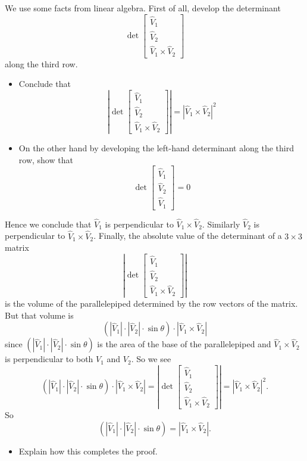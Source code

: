 \documentclass{ximera}
\begin{document}
\begin{problem}
We use some facts from linear algebra. First of all, develop the determinant%
\[
\det
\begin{bmatrix}
\hat{V}_{1} \\
\hat{V}_{2} \\
\hat{V}_{1}\times\hat{V}_{2}
\end{bmatrix}
\]
along the third row.
\begin{itemize}
\item Conclude that 
\[
\left\vert
\det
\begin{bmatrix}
\hat{V}_{1} \\
\hat{V}_{2} \\
\hat{V}_{1}\times\hat{V}_{2}
\end{bmatrix}\right\vert
=\left\vert \hat{V}_{1}\times\hat{V}_{2}\right\vert ^{2}
\]
\item On the other hand by developing the left-hand determinant along
  the third row, show that
\[
\det
\begin{bmatrix}
\hat{V}_{1} \\
\hat{V}_{2} \\
\hat{V}_{1}
\end{bmatrix}
=0
\]
\end{itemize}
Hence we conclude that $\hat{V}_{1}$ is perpendicular to
$\hat{V}_{1}\times\hat{V}_{2}$. Similarly $\hat{V}_{2}$ is
perpendicular to $\hat{V}_{1}\times\hat{V}_{2}$. Finally, the absolute
value of the determinant of a $3\times3$ matrix%
\[
\left\vert
\det
\begin{bmatrix}
\hat{V}_{1} \\
\hat{V}_{2} \\
\hat{V}_{1}\times\hat{V}_{2}
\end{bmatrix}
\right\vert
\]
is the volume of the parallelepiped determined by the row vectors of the
matrix. But that volume is%
\[
\left( \left\vert \hat{V}_{1}\right\vert \cdot\left\vert \hat{V}%
_{2}\right\vert \cdot\sin\theta\right)  \cdot\left\vert \hat{V}%
_{1}\times\hat{V}_{2}\right\vert
\]
since $\left(  \left\vert \hat{V}_{1}\right\vert \cdot\left\vert \hat{V}%
_{2}\right\vert \cdot\sin\theta\right)  $ is the area of the base
of the parallelepiped and $\hat{V}_{1}\times\hat{V}_{2}$ is perpendicular to
both $V_{1}$ and $V_{2}$. So we see
\[
\left(  \left\vert \hat{V}_{1}\right\vert \cdot\left\vert \hat{V}%
_{2}\right\vert \cdot\sin\theta\right)  \cdot\left\vert \hat{V}%
_{1}\times\hat{V}_{2}\right\vert =\left\vert
\det\begin{bmatrix}
\hat{V}_{1} \\
\hat{V}_{2} \\
\hat{V}_{1}\times\hat{V}_{2}
\end{bmatrix}
\right\vert =\left\vert \hat{V}_{1}\times\hat{V}_{2}\right\vert ^{2}.
\]
So%
\[
\left(  \left\vert \hat{V}_{1}\right\vert \cdot\left\vert \hat{V}%
_{2}\right\vert \cdot\sin\theta\right)  =\left\vert \hat{V}%
_{1}\times\hat{V}_{2}\right\vert .
\]
\begin{itemize}
\item Explain how this completes the proof. 
\end{itemize}
\end{problem}
\end{document}

